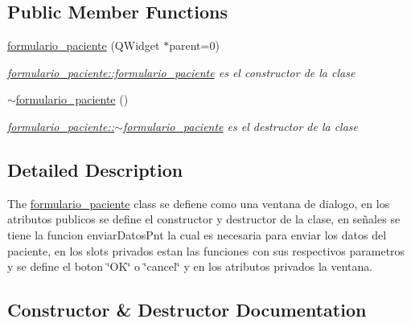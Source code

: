 \subsection*{Public Member Functions}
\begin{DoxyCompactItemize}
\item 
\hyperlink{classformulario__paciente_ad200fdaad0f9dca8f1b55831d8fee231}{formulario\+\_\+paciente} (Q\+Widget $\ast$parent=0)
\begin{DoxyCompactList}\small\item\em \hyperlink{classformulario__paciente_ad200fdaad0f9dca8f1b55831d8fee231}{formulario\+\_\+paciente\+::formulario\+\_\+paciente} es el constructor de la clase \end{DoxyCompactList}\item 
\mbox{\label{classformulario__paciente_a2cd63626c086806c4040c440322eae47}} 
\hyperlink{classformulario__paciente_a2cd63626c086806c4040c440322eae47}{$\sim$formulario\+\_\+paciente} ()
\begin{DoxyCompactList}\small\item\em \hyperlink{classformulario__paciente_a2cd63626c086806c4040c440322eae47}{formulario\+\_\+paciente\+::$\sim$formulario\+\_\+paciente} es el destructor de la clase \end{DoxyCompactList}\end{DoxyCompactItemize}


\subsection{Detailed Description}
The \hyperlink{classformulario__paciente}{formulario\+\_\+paciente} class se defiene como una ventana de dialogo, en los atributos publicos se define el constructor y destructor de la clase, en señales se tiene la funcion enviar\+Datos\+Pnt la cual es necesaria para enviar los datos del paciente, en los slots privados estan las funciones con sus respectivos parametros y se define el boton \char`\"{}\+O\+K\char`\"{} o \char`\"{}cancel\char`\"{} y en los atributos privados la ventana. 

\subsection{Constructor \& Destructor Documentation}
\mbox{\label{classformulario__paciente_ad200fdaad0f9dca8f1b55831d8fee231}} 
